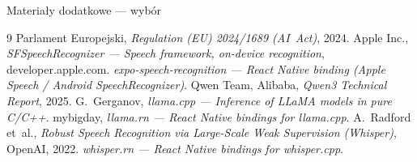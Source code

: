 \documentclass[aspectratio=169,11pt]{beamer}
\begin{document}
\appendix

\begin{frame}[allowframebreaks]{Materiały dodatkowe — wybór}
  \footnotesize
  \begin{thebibliography}{9}
      Parlament Europejski, \emph{Regulation (EU) 2024/1689 (AI~Act)}, 2024.
      Apple Inc., \emph{SFSpeechRecognizer — Speech framework, on-device recognition}, developer.apple.com.
      \emph{expo-speech-recognition — React Native binding (Apple Speech / Android SpeechRecognizer)}.
      Qwen Team, Alibaba, \emph{Qwen3 Technical Report}, 2025.
      G.~Gerganov, \emph{llama.cpp — Inference of LLaMA models in pure C/C++}.
      mybigday, \emph{llama.rn — React Native bindings for llama.cpp}.
      A.~Radford et~al., \emph{Robust Speech Recognition via Large-Scale Weak Supervision (Whisper)}, OpenAI, 2022.
      \emph{whisper.rn — React Native bindings for whisper.cpp}.
  \end{thebibliography}
\end{frame}
\end{document}
